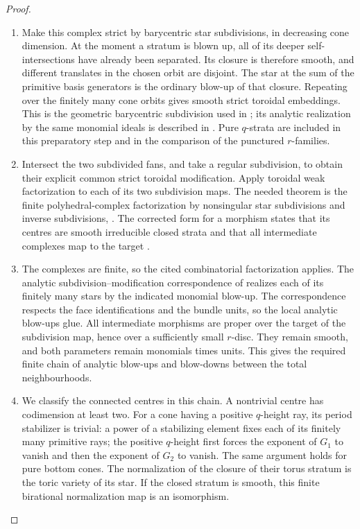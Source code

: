 \begin{proof}
\begin{enumerate}[label=\arabic*.,leftmargin=*]
\item Make this complex strict by barycentric star subdivisions,
in decreasing cone dimension. At the moment a stratum
is blown up, all of its deeper self-intersections have
already been separated. Its closure is therefore smooth,
and different translates in the chosen orbit are disjoint.
The star at the sum of the primitive basis generators is
the ordinary blow-up of that closure. Repeating over the
finitely many cone orbits gives smooth strict toroidal
embeddings. This is the geometric barycentric subdivision
used in \cite[Section 5.6, pp.565--566]{AKMW02AB}; its
analytic realization by the same monomial ideals is
described in \cite[Section~5.5, pp.~564--565]{AKMW02AB}. Pure $q$-strata
are included in this preparatory step and in the comparison of
the punctured $r$-families.

\item Intersect the two subdivided fans, and take a regular
subdivision, to obtain their explicit common strict
toroidal modification. Apply toroidal weak factorization
to each of its two subdivision maps. The needed theorem
is the finite polyhedral-complex factorization by
nonsingular star subdivisions and inverse subdivisions,
\cite[Theorem~1.6.1, p.~543; Theorem~2.7.1, pp.~551--552]{AKMW02AB}. The corrected
form for a morphism states that its centres are smooth
irreducible closed strata and that all intermediate
complexes map to the target
\cite[Section 2, p.2]{Matsuki00ErrAB}.

\item The complexes are finite, so the cited combinatorial
factorization applies. The analytic
subdivision--modification correspondence of
\cite[Section~5.5, pp.~564--565]{AKMW02AB} realizes each of its finitely
many stars by the indicated monomial blow-up.
The correspondence respects the face identifications
and the bundle units, so the local analytic blow-ups
glue. All intermediate morphisms are proper over the
target of the subdivision map, hence over a sufficiently
small $r$-disc. They remain smooth, and both parameters
remain monomials times units. This gives the required
finite chain of analytic blow-ups and blow-downs
between the total neighbourhoods.

\item We classify the connected centres in this chain. A
nontrivial centre has codimension at least two. For a
cone having a positive $q$-height ray, its period
stabilizer is trivial: a power of a stabilizing element
fixes each of its finitely many primitive rays; the
positive $q$-height first forces the exponent of $G_1$
to vanish and then the exponent of $G_2$ to vanish.
The same argument holds for pure bottom cones. The normalization of the closure of their torus stratum
is the toric variety of its star. If the closed stratum
is smooth, this finite birational normalization map is
an isomorphism.


\end{enumerate}
\end{proof}
